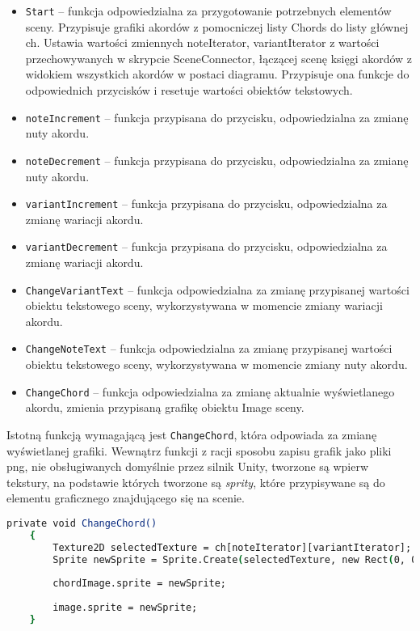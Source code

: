 \begin{itemize}
    \item \texttt{Start} -- funkcja odpowiedzialna za przygotowanie potrzebnych elementów sceny. Przypisuje grafiki akordów z pomocniczej listy Chords do listy głównej ch. Ustawia wartości zmiennych noteIterator, variantIterator z wartości przechowywanych w skrypcie SceneConnector, łączącej scenę księgi akordów z widokiem wszystkich akordów w postaci diagramu. Przypisuje ona funkcje do odpowiednich przycisków i resetuje wartości obiektów tekstowych.
    \item \texttt{noteIncrement} -- funkcja przypisana do przycisku, odpowiedzialna za zmianę nuty akordu.
    \item \texttt{noteDecrement} -- funkcja przypisana do przycisku, odpowiedzialna za zmianę nuty akordu.
    \item \texttt{variantIncrement} -- funkcja przypisana do przycisku, odpowiedzialna za zmianę wariacji akordu.
    \item \texttt{variantDecrement} -- funkcja przypisana do przycisku, odpowiedzialna za zmianę wariacji akordu.
    \item \texttt{ChangeVariantText} -- funkcja odpowiedzialna za zmianę przypisanej wartości obiektu tekstowego sceny, wykorzystywana w momencie zmiany wariacji akordu.
    \item \texttt{ChangeNoteText} -- funkcja odpowiedzialna za zmianę przypisanej wartości obiektu tekstowego sceny, wykorzystywana w momencie zmiany nuty akordu.
    \item \texttt{ChangeChord} -- funkcja odpowiedzialna za zmianę aktualnie wyświetlanego akordu, zmienia przypisaną grafikę obiektu Image sceny.
\end{itemize}

Istotną funkcją wymagającą jest \texttt{ChangeChord}, która odpowiada za zmianę wyświetlanej grafiki. Wewnątrz funkcji z racji sposobu zapisu grafik jako pliki png, nie obsługiwanych domyślnie przez silnik Unity, tworzone są wpierw tekstury, na podstawie których tworzone są \emph{sprity}, które przypisywane są do elementu graficznego znajdującego się na scenie.

\begin{lstlisting}[language=csh,caption=Funkcja \texttt{ChangeChord}, label=lst:3]
    private void ChangeChord()
    {
        Texture2D selectedTexture = ch[noteIterator][variantIterator];
        Sprite newSprite = Sprite.Create(selectedTexture, new Rect(0, 0, selectedTexture.width, selectedTexture.height), new Vector2(0.5f, 0.5f));
        
        chordImage.sprite = newSprite;
        
        image.sprite = newSprite;
    }
\end{lstlisting}

